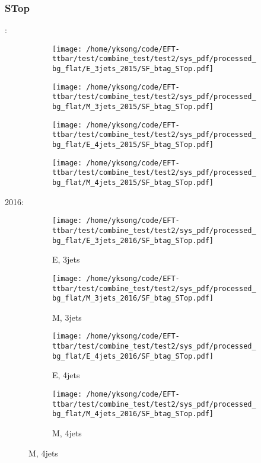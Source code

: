 \documentclass{beamer}
\begin{document}
\begin{frame}
\frametitle{STop}
\fontsize{5}{1}:
\begin{figure}
\centering
\begin{subfigure}[b]{0.24\textwidth}
\texttt{[image: /home/yksong/code/EFT-ttbar/test/combine\_test/test2/sys\_pdf/processed\_bg\_flat/E\_3jets\_2015/SF\_btag\_STop.pdf]}
\end{subfigure}
\begin{subfigure}[b]{0.24\textwidth}
\texttt{[image: /home/yksong/code/EFT-ttbar/test/combine\_test/test2/sys\_pdf/processed\_bg\_flat/M\_3jets\_2015/SF\_btag\_STop.pdf]}
\end{subfigure}
\begin{subfigure}[b]{0.24\textwidth}
\texttt{[image: /home/yksong/code/EFT-ttbar/test/combine\_test/test2/sys\_pdf/processed\_bg\_flat/E\_4jets\_2015/SF\_btag\_STop.pdf]}
\end{subfigure}
\begin{subfigure}[b]{0.24\textwidth}
\texttt{[image: /home/yksong/code/EFT-ttbar/test/combine\_test/test2/sys\_pdf/processed\_bg\_flat/M\_4jets\_2015/SF\_btag\_STop.pdf]}
\end{subfigure}
\end{figure}
2016:
\begin{figure}
\centering
\begin{subfigure}[b]{0.24\textwidth}
\texttt{[image: /home/yksong/code/EFT-ttbar/test/combine\_test/test2/sys\_pdf/processed\_bg\_flat/E\_3jets\_2016/SF\_btag\_STop.pdf]}
\captionsetup{font=tiny}
\caption{E, 3jets}
\end{subfigure}
\begin{subfigure}[b]{0.24\textwidth}
\texttt{[image: /home/yksong/code/EFT-ttbar/test/combine\_test/test2/sys\_pdf/processed\_bg\_flat/M\_3jets\_2016/SF\_btag\_STop.pdf]}
\captionsetup{font=tiny}
\caption{M, 3jets}
\end{subfigure}
\begin{subfigure}[b]{0.24\textwidth}
\texttt{[image: /home/yksong/code/EFT-ttbar/test/combine\_test/test2/sys\_pdf/processed\_bg\_flat/E\_4jets\_2016/SF\_btag\_STop.pdf]}
\captionsetup{font=tiny}
\caption{E, 4jets}
\end{subfigure}
\begin{subfigure}[b]{0.24\textwidth}
\texttt{[image: /home/yksong/code/EFT-ttbar/test/combine\_test/test2/sys\_pdf/processed\_bg\_flat/M\_4jets\_2016/SF\_btag\_STop.pdf]}
\captionsetup{font=tiny}
\caption{M, 4jets}
\end{subfigure}
\end{figure}
\end{frame}
\end{document}
